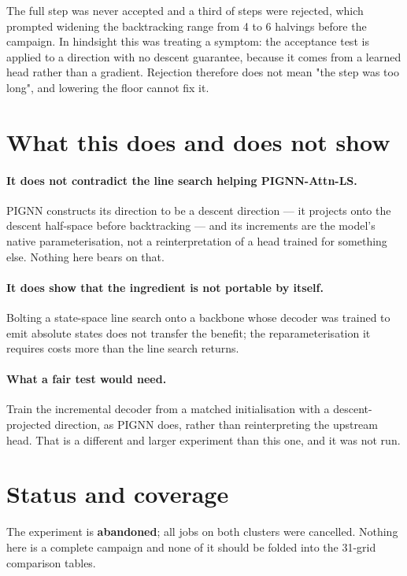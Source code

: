 \documentclass[10pt]{article}
\begin{document}
The full step was never accepted and a third of steps were rejected, which
prompted widening the backtracking range from 4 to 6 halvings before the
campaign. In hindsight this was treating a symptom: the acceptance test is
applied to a direction with no descent guarantee, because it comes from a
learned head rather than a gradient. Rejection therefore does not mean "the step
was too long", and lowering the floor cannot fix it.

\section{What this does and does not show}

\paragraph{It does not contradict the line search helping PIGNN-Attn-LS.} PIGNN
constructs its direction to be a descent direction --- it projects onto the
descent half-space before backtracking --- and its increments are the model's
native parameterisation, not a reinterpretation of a head trained for something
else. Nothing here bears on that.

\paragraph{It does show that the ingredient is not portable by itself.} Bolting a
state-space line search onto a backbone whose decoder was trained to emit
absolute states does not transfer the benefit; the reparameterisation it requires
costs more than the line search returns.

\paragraph{What a fair test would need.} Train the incremental decoder from a
matched initialisation with a descent-projected direction, as PIGNN does, rather
than reinterpreting the upstream head. That is a different and larger experiment
than this one, and it was not run.

\section{Status and coverage}

The experiment is \textbf{abandoned}; all jobs on both clusters were cancelled.
Nothing here is a complete campaign and none of it should be folded into the
31-grid comparison tables.
\end{document}
